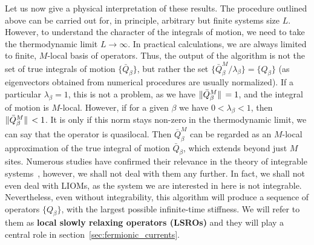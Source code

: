 Let us now give a physical interpretation of these results. The procedure outlined above
can be carried out for, in principle, arbitrary but finite systems size \(L\). However,
to understand the character of the integrals of motion, we need to take the thermodynamic
limit \(L\to\infty\). In practical calculations, we are always limited to finite, \(M\)-local basis
of operators. Thus, the output of the algorithm is not the set of true integrals of motion \(\{\bar{Q}_{\beta}\}\),
but rather the set \(\{\bar{Q} _{\beta}^M / \lambda_{\beta} \}=\{Q_{\beta}\}\) (as eigenvectors obtained from numerical
procedures are usually normalized). If a particular \(\lambda_{\beta} = 1\), this
is not a problem, as we have \(\norm*{\bar{Q}^M_{\beta}} = 1\), and the integral of motion is \(M\)-local.
However, if for a given \({\beta}\) we have \(0 < \lambda_{\beta} < 1\), then \(\norm*{\bar{Q} ^M_{\beta}} < 1\).
It is only if this norm stays non-zero in the thermodynamic limit, we can say that the operator is
quasilocal. Then \(\bar{Q} _{\beta}^M\)
can be regarded as an \(M\)-local approximation of the true integral of motion \(\bar{Q} _{\beta}\), which
extends beyond just \(M\) sites. 
Numerous studies have confirmed their relevance in the theory of integrable
systems~\autocite{Ilievski2015, Ilievski2015a, Prosen2013, Prosen2014},
however, we shall not deal with them any further. In fact, we shall not even deal with LIOMs, as
the system we are interested in here is not integrable. Nevertheless, even without integrability,
this algorithm will produce a sequence of operators \(\{Q_{\beta}\}\), with the largest possible
infinite-time stiffness. We will refer to them as \textbf{local slowly relaxing operators (LSROs)}
and they will play a central role in section~\ref{sec:fermionic_currents}. 

